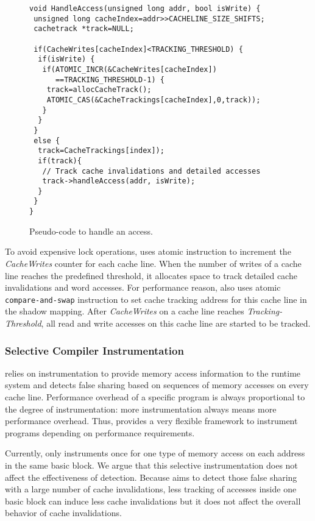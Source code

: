 \begin{figure}[!t]
\begin{lstlisting}
void HandleAccess(unsigned long addr, bool isWrite) {
 unsigned long cacheIndex=addr>>CACHELINE_SIZE_SHIFTS;
 cachetrack *track=NULL;

 if(CacheWrites[cacheIndex]<TRACKING_THRESHOLD) {
  if(isWrite) {
   if(ATOMIC_INCR(&CacheWrites[cacheIndex]) 
      ==TRACKING_THRESHOLD-1) {
    track=allocCacheTrack();
    ATOMIC_CAS(&CacheTrackings[cacheIndex],0,track));
   }
  } 
 }
 else {
  track=CacheTrackings[index]);
  if(track){
   // Track cache invalidations and detailed accesses
   track->handleAccess(addr, isWrite);
  }
 }
}
\end{lstlisting}
\caption{Pseudo-code to handle an access.\label{fig:algorithm}}
\end{figure}

To avoid expensive lock operations, \Predator{} uses atomic instruction to increment 
the {\it CacheWrites} counter for each cache line. 
When the number of writes of a cache line reaches the predefined threshold,
it allocates space to track detailed cache invalidations and word accesses.
For performance reason, \Predator{} also 
uses atomic \texttt{compare-and-swap} instruction to set cache tracking address for this cache line in
the shadow mapping.
After {\it CacheWrites} on a cache line reaches {\it Tracking-Threshold}, 
all read and write accesses on this cache line are started to be tracked.


\subsubsection{Selective Compiler Instrumentation}
\Predator{} relies on instrumentation to provide memory access information to the runtime system 
and detects false sharing based on sequences of memory accesses on every cache line. 
Performance overhead of a specific program is always proportional to 
the degree of instrumentation: more 
instrumentation always means more performance overhead. 
Thus, \Predator{} provides a very flexible framework to instrument programs 
depending on performance requirements. 

Currently, \Predator{} only instruments once for one type of memory access on each address 
in the same basic block. 
We argue that this selective instrumentation does not affect the effectiveness of detection. 
Because \Predator{} aims to detect those false sharing with a large number of cache invalidations,
less tracking of accesses inside one basic block can induce less cache invalidations 
but it does not affect the overall behavior of cache invalidations. 

